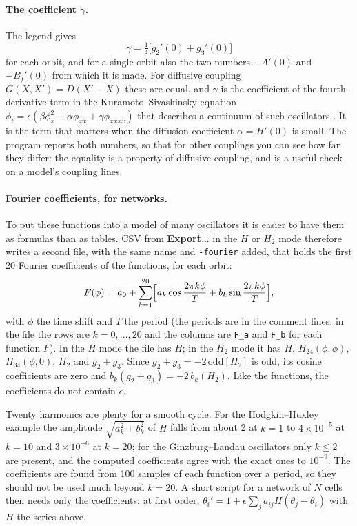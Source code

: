 \documentclass[11pt,a4paper]{article}
\newcommand{\ui}[1]{\textsf{\textbf{#1}}}          %
\begin{document}
\paragraph{The coefficient $\gamma$.} The legend gives
\begin{equation}
  \gamma=\tfrac14\bigl[g_2'(0)+g_3'(0)\bigr]
\end{equation}
for each orbit, and for a single orbit also the two numbers $-A'(0)$ and $-B_f'(0)$ from which it is made. For diffusive coupling $G(X,X')=D(X'-X)$ these are equal, and $\gamma$ is the coefficient of the fourth-derivative term in the Kuramoto--Sivashinsky equation $\phi_t=\epsilon(\beta\phi_x^2+\alpha\phi_{xx}+\gamma\phi_{xxxx})$ that describes a continuum of such oscillators \cite{wilson2019,kuramoto1984}. It is the term that matters when the diffusion coefficient $\alpha=H'(0)$ is small. The program reports both numbers, so that for other couplings you can see how far they differ: the equality is a property of diffusive coupling, and is a useful check on a model's coupling lines.

\paragraph{Fourier coefficients, for networks.}\label{sec:fourier} To put these functions into a model of many oscillators it is easier to have them as formulas than as tables. CSV from \ui{Export\ldots} in the $H$ or $H_2$ mode therefore writes a second file, with the same name and \texttt{-fourier} added, that holds the first 20 Fourier coefficients of the functions, for each orbit:
\begin{equation}
  F(\phi)=a_0+\sum_{k=1}^{20}\Bigl[a_k\cos\frac{2\pi k\phi}{T}+b_k\sin\frac{2\pi k\phi}{T}\Bigr],
\end{equation}
with $\phi$ the time shift and $T$ the period (the periods are in the comment lines; in the file the rows are $k=0,\dots,20$ and the columns are \texttt{F\_a} and \texttt{F\_b} for each function $F$). In the $H$ mode the file has $H$; in the $H_2$ mode it has $H$, $H_{24}(\phi,\phi)$, $H_{34}(\phi,0)$, $H_2$ and $g_2+g_3$. Since $g_2+g_3=-2\,\mathrm{odd}[H_2]$ is odd, its cosine coefficients are zero and $b_k(g_2+g_3)=-2\,b_k(H_2)$. Like the functions, the coefficients do not contain $\epsilon$.

Twenty harmonics are plenty for a smooth cycle. For the Hodgkin--Huxley example the amplitude $\sqrt{a_k^2+b_k^2}$ of $H$ falls from about 2 at $k=1$ to $4\times10^{-5}$ at $k=10$ and $3\times10^{-6}$ at $k=20$; for the Ginzburg--Landau oscillators only $k\le2$ are present, and the computed coefficients agree with the exact ones to $10^{-9}$. The coefficients are found from 100 samples of each function over a period, so they should not be used much beyond $k=20$. A short script for a network of $N$ cells then needs only the coefficients: at first order, $\theta_i'=1+\epsilon\sum_j a_{ij}H(\theta_j-\theta_i)$ with $H$ the series above.
\end{document}
